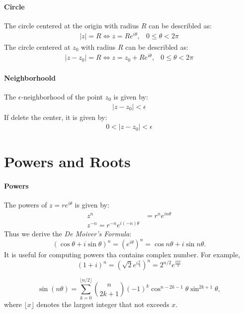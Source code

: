 \paragraph{Circle} The circle centered at the origin with radius $R$ can be describled as:
\[
\begin{array}{ll}
|z| = R\Longleftrightarrow z = Re^{i\theta},
&
0\le\theta<2\pi
\end{array}
\]
The circle centered at $z_0$ with radius $R$ can be describled as:
\[
\begin{array}{ll}
|z-z_0| = R\Longleftrightarrow z = z_0+Re^{i\theta},
&
0\le\theta<2\pi
\end{array}
\]

\paragraph{Neighborhoold} The $\epsilon$-neighborhood of the point $z_0$ is given by:
\[
\begin{array}{l}
|z-z_0| < \epsilon
\end{array}
\]
If delete the center, it is given by:
\[
\begin{array}{l}
0<|z-z_0| < \epsilon
\end{array}
\]



\section{Powers and Roots}
\paragraph{Powers}
The powers of $z=re^{i\theta}$ is given by:
\begin{align*}
z^n&=r^ne^{in\theta}\\
z^{-n} = r^{-n}e^{i(-n)\theta}
\end{align*}
Thus we derive the \emph{De Moiver's Formula}:
\[
(\cos\theta+i\sin\theta)^n=(e^{i\theta})^n
=\cos n\theta+i\sin n\theta.
\]
It is useful for computing powers tha contains complex number. For example,
\[
(1+i)^n = (\sqrt{2}e^{i\frac{\pi}{4}})^n
=2^{n/2}e^{\frac{in\pi}{4}}
\]
\begin{proposition}
\[
\sin(n\theta) = \sum_{k=0}^{\lfloor{n/2}\rfloor}\binom{n}{2k+1}(-1)^k\cos^{n-2k-1}\theta\sin^{2k+1}\theta,
\]
where $\lfloor{x}\rfloor$ denotes the largest integer that not exceeds $x$.
\end{proposition}
